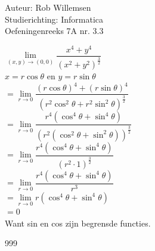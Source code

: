 \documentclass[a4paper]{article}
\begin{document}
\noindent \large Auteur: Rob Willemsen \\
\noindent \large Studierichting: Informatica \\
\noindent \large Oefeningenreeks 7A nr. 3.3 \\

\medskip

\normalsize

$\lim\limits_{(x, y) \rightarrow (0, 0)} \dfrac{x^4+y^4}{(x^2+y^2)^{\tfrac{3}{2}}}$ \\

$x = r \cos\theta$ en $y = r \sin\theta$ \\

$= \lim\limits_{r \rightarrow 0} \dfrac{(r \cos\theta)^4 + (r \sin\theta)^4}{(r^2\cos^2\theta + r^2\sin^2\theta)^{\tfrac{3}{2}}}$ \\

$= \lim\limits_{r \rightarrow 0} \dfrac{r^4(\cos^4\theta + \sin^4\theta)}{(r^2 (\cos^2\theta + \sin^2\theta))^{\tfrac{3}{2}}}$ \\

$= \lim\limits_{r \rightarrow 0} \dfrac{r^4(\cos^4\theta + \sin^4\theta)}{(r^2 \cdot 1)^{\tfrac{3}{2}}}$ \\

$= \lim\limits_{r \rightarrow 0} \dfrac{r^4(\cos^4\theta + \sin^4\theta)}{r^3}$ \\

$= \lim\limits_{r \rightarrow 0} r(\cos^4\theta + \sin^4\theta)$ \\

$= 0$ \\

Want sin en cos zijn begrensde functies. \\

\begin{thebibliography}{999}
\end{thebibliography}
\end{document}
